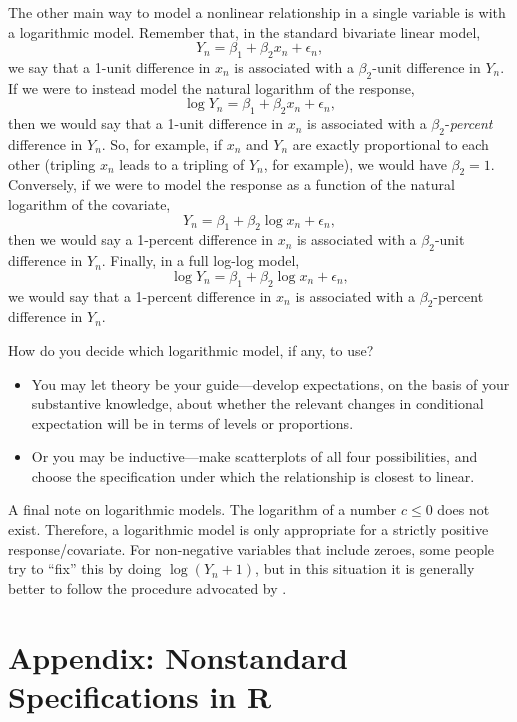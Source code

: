 \documentclass[
  12pt,
  oneside,openany]{book}
\begin{document}
The other main way to model a nonlinear relationship in a single variable is with a logarithmic model. Remember that, in the standard bivariate linear model,
\[
Y_n = \beta_1 + \beta_2 x_n + \epsilon_n,
\]
we say that a 1-unit difference in \(x_n\) is associated with a \(\beta_2\)-unit difference in \(Y_n\). If we were to instead model the natural logarithm of the response,
\[
\log Y_n = \beta_1 + \beta_2 x_n + \epsilon_n,
\]
then we would say that a 1-unit difference in \(x_n\) is associated with a \(\beta_2\)-\emph{percent} difference in \(Y_n\). So, for example, if \(x_n\) and \(Y_n\) are exactly proportional to each other (tripling \(x_n\) leads to a tripling of \(Y_n\), for example), we would have \(\beta_2 = 1\). Conversely, if we were to model the response as a function of the natural logarithm of the covariate,
\[
Y_n = \beta_1 + \beta_2 \log x_n + \epsilon_n,
\]
then we would say a 1-percent difference in \(x_n\) is associated with a \(\beta_2\)-unit difference in \(Y_n\). Finally, in a full log-log model,
\[
\log Y_n = \beta_1 + \beta_2 \log x_n + \epsilon_n,
\]
we would say that a 1-percent difference in \(x_n\) is associated with a \(\beta_2\)-percent difference in \(Y_n\).

How do you decide which logarithmic model, if any, to use?

\begin{itemize}
\item
  You may let theory be your guide---develop expectations, on the basis of your substantive knowledge, about whether the relevant changes in conditional expectation will be in terms of levels or proportions.
\item
  Or you may be inductive---make scatterplots of all four possibilities, and choose the specification under which the relationship is closest to linear.
\end{itemize}

A final note on logarithmic models. The logarithm of a number \(c \leq 0\) does not exist. Therefore, a logarithmic model is only appropriate for a strictly positive response/covariate. For non-negative variables that include zeroes, some people try to ``fix'' this by doing \(\log(Y_n + 1)\), but in this situation it is generally better to follow the procedure advocated by \citet{burbidge1988alternative}.

\hypertarget{appendix-nonstandard-specifications-in-r}{%
\section{Appendix: Nonstandard Specifications in R}\label{appendix-nonstandard-specifications-in-r}}
\end{document}
